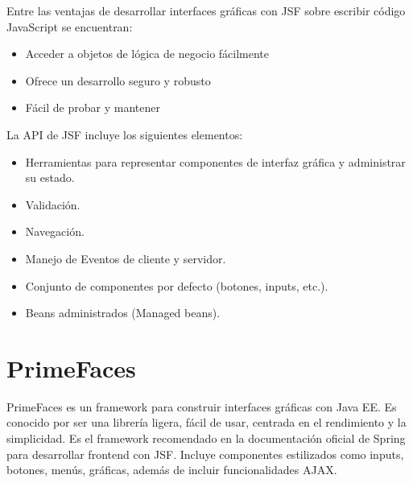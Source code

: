 Entre las ventajas de desarrollar interfaces gráficas con JSF sobre escribir código JavaScript se encuentran:

\begin{itemize}
  \item Acceder a objetos de lógica de negocio fácilmente 
  \item Ofrece un desarrollo seguro y robusto
  \item Fácil de probar y mantener 
\end{itemize}

La API de JSF incluye los siguientes elementos: 
\begin{itemize}
  \item Herramientas para representar componentes de interfaz gráfica y administrar su estado.
  \item Validación.
  \item Navegación.
  \item Manejo de Eventos de cliente y servidor.
  \item Conjunto de componentes por defecto (botones, inputs, etc.).
  \item Beans administrados (Managed beans).
\end{itemize}

\section{PrimeFaces}
PrimeFaces es un framework para construir interfaces gráficas con Java EE.
Es conocido por ser una librería ligera, fácil de usar, centrada en el rendimiento y la simplicidad. Es el framework recomendado en la documentación oficial de Spring para desarrollar frontend con JSF.
Incluye componentes estilizados como inputs, botones, menús, gráficas, además de incluir funcionalidades AJAX.

